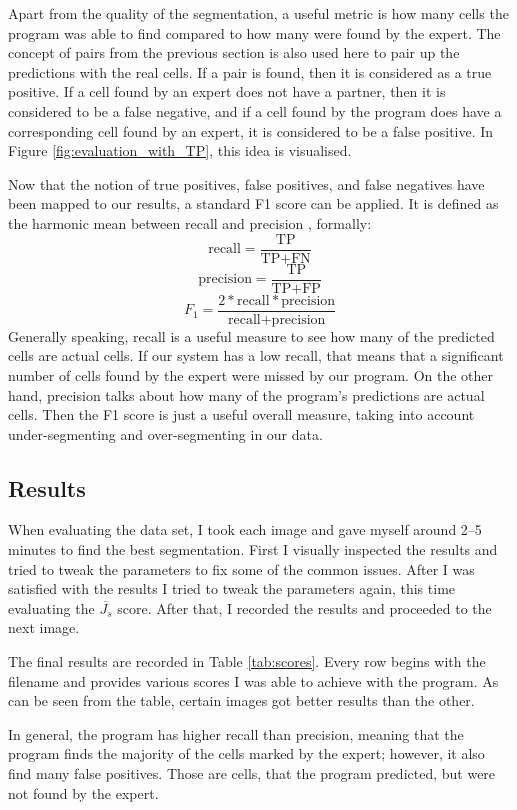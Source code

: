 \documentclass[
  digital,     %
  oneside,     %
  nosansbold,  %
  nocolorbold, %
  lof,         %
  lot,         %
]{fithesis4}
\begin{document}
Apart from the quality of the segmentation, a useful metric is how many cells
the program was able to find compared to how many were found by the expert. The
concept of pairs from the previous section is also used here to pair up the
predictions with the real cells. If a pair is found, then it is considered as a
true positive. If a cell found by an expert does not have a partner, then it is
considered to be a false negative, and if a cell found by the program does have
a corresponding cell found by an expert, it is considered to be a false
positive. In Figure \ref{fig:evaluation_with_TP}, this idea is visualised.

Now that the notion of true positives, false positives, and false negatives have
been mapped to our results, a standard F1 score can be applied. It is defined as
the harmonic mean between recall and precision \cite{sklearn-f1score}, formally:
$$\text{recall} = \frac{\text{TP}}{\text{TP} + \text{FN}}$$
$$\text{precision} = \frac{\text{TP}}{\text{TP} + \text{FP}}$$
$$F_1 = \frac{2 * \text{recall} * \text{precision}}{\text{recall} +
\text{precision}}$$
Generally speaking, recall is a useful measure to see how many of the predicted
cells are actual cells. If our system has a low recall, that means that a
significant number of cells found by the expert were missed by our program. On
the other hand, precision talks about how many of the program's predictions are actual
cells. Then the F1 score is just a useful overall measure, taking into account
under-segmenting and over-segmenting in our data.

\subsection{Results}
When evaluating the data set, I took each image and gave myself around 2--5
minutes to find the best segmentation. First I visually inspected the results
and tried to tweak the parameters to fix some of the common issues. After I was
satisfied with the results I tried to tweak the parameters again, this time
evaluating the $\overline{J_s}$ score. After that, I recorded the results and
proceeded to the next image.

The final results are recorded in Table \ref{tab:scores}. Every row begins
with the filename and provides various scores I was able to achieve with the
program. As can be seen from the table, certain images got better results than
the other.

In general, the program has higher recall than precision, meaning that the
program finds the majority of the cells marked by the expert; however, it also
find many false positives. Those are cells, that the program predicted, but were
not found by the expert.
\end{document}
